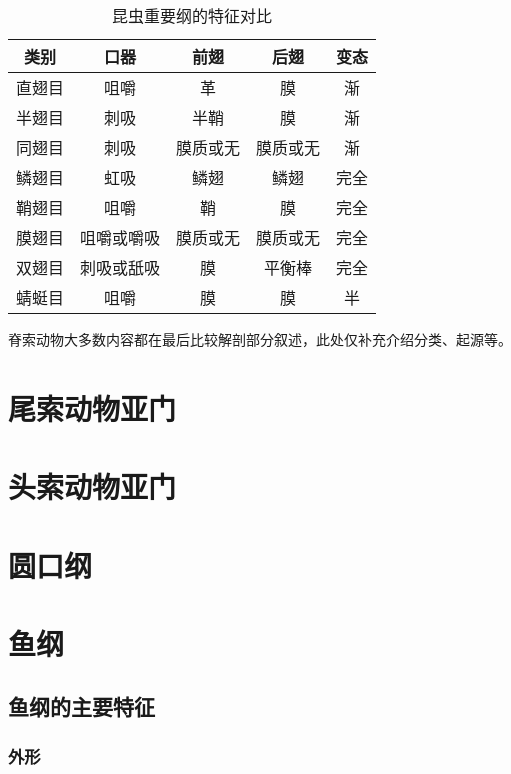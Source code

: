 \begin{table}[htbp]
	\centering
	\begin{tabularx}{\textwidth}{|c|C|C|C|C|}
		\hline
		\textbf{类别} & \textbf{口器} & \textbf{前翅} & \textbf{后翅} & \textbf{变态} \\ \hline
		直翅目 & 咀嚼 & 革 & 膜 & 渐 \\ \hline
		半翅目 & 刺吸 & 半鞘 & 膜 & 渐 \\ \hline
		同翅目 & 刺吸 & 膜质或无 & 膜质或无 & 渐 \\ \hline
		鳞翅目 & 虹吸 & 鳞翅 & 鳞翅 & 完全 \\ \hline
		鞘翅目 & 咀嚼 & 鞘 & 膜 & 完全 \\ \hline
		膜翅目 & 咀嚼或嚼吸 & 膜质或无 & 膜质或无 & 完全 \\ \hline
		双翅目 & 刺吸或舐吸 & 膜 & 平衡棒 & 完全 \\ \hline
		蜻蜓目 & 咀嚼 & 膜 & 膜 & 半 \\ \hline
	\end{tabularx}
	\caption{昆虫重要纲的特征对比}
	\label{tab:insect_speciality}
\end{table}

脊索动物大多数内容都在最后比较解剖部分叙述，此处仅补充介绍分类、起源等。

\section{尾索动物亚门}

\section{头索动物亚门}

\section{圆口纲}

\section{鱼纲}

\subsection{鱼纲的主要特征}

\subsubsection{外形}


